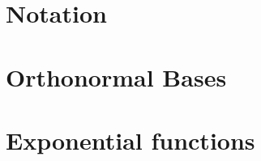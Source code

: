 \documentclass[../thesis.tex]{subfiles}
\begin{document}
\section{Notation}
    

\section{Orthonormal Bases}
    


\section{Exponential functions}
    

\end{document}
